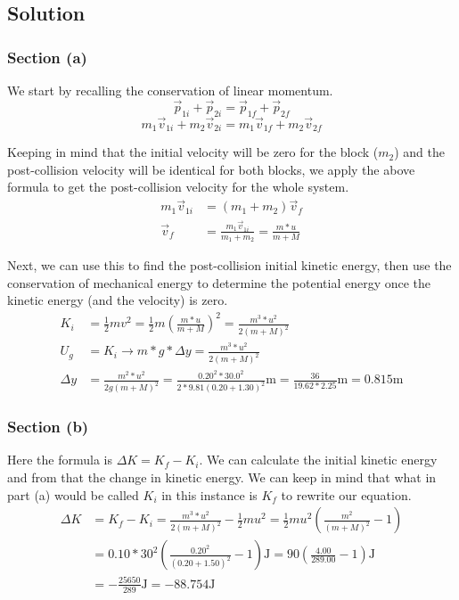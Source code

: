 \documentclass[12pt]{article}
\begin{document}
\subsection*{Solution}
\subsubsection*{Section (a)}
We start by recalling the conservation of linear momentum.
\[ \vec{p}_{1i} + \vec{p}_{2i} = \vec{p}_{1f} + \vec{p}_{2f} \]
\[ m_1\vec{v}_{1i} + m_2\vec{v}_{2i} = m_1\vec{v}_{1f} + m_2\vec{v}_{2f} \]

Keeping in mind that the initial velocity will be zero for the block ($m_2$) and the post-collision velocity will be identical for both blocks, we apply the above formula to get the post-collision velocity for the whole system.
\begin{align*}
    m_1\vec{v}_{1i} &=  (m_1 + m_2)\vec{v}_{f}\\
    \vec{v}_{f} &=  \frac{m_1\vec{v}_{1i}}{m_1 + m_2} = \frac{m*u}{m+M}
\end{align*}

Next, we can use this to find the post-collision initial kinetic energy, then use the conservation of mechanical energy to determine the potential energy once the kinetic energy (and the velocity) is zero.
\begin{align*}
    K_i &=  \frac{1}{2}mv^2
        =   \frac{1}{2}m\left(\frac{m*u}{m+M}\right)^2
        =   \frac{m^3*u^2}{2(m+M)^2}\\
    U_g &=  K_i\rightarrow
    m*g*\Delta y    =  \frac{m^3*u^2}{2(m+M)^2}\\
    \Delta y    &=  \frac{m^2*u^2}{2g(m+M)^2}
        =   \frac{0.20^2*30.0^2}{2*9.81(0.20+1.30)^2}\unit{\meter}
        =   \frac{36}{19.62*2.25}\unit{\meter}
        =   \boxed{0.815\unit{\meter}}
\end{align*}

\pagebreak
\subsubsection*{Section (b)}
Here the formula is \( \Delta K = K_f - K_i \). We can calculate the initial kinetic energy and from that the change in kinetic energy. We can keep in mind that what in part (a) would be called \(K_i\) in this instance is \(K_f\) to rewrite our equation.
\begin{align*}
    \Delta K    &=  K_f - K_i
        =   \frac{m^3*u^2}{2(m+M)^2} - \frac{1}{2}mu^2
        =   \frac{1}{2}mu^2\left(\frac{m^2}{(m+M)^2} - 1\right)\\
        &=  0.10*30^2\left(\frac{0.20^2}{(0.20+1.50)^2} - 1\right) \unit{\joule}
        =   90\left(\frac{4.00}{289.00} - 1\right) \unit{\joule}\\
        &=  \boxed{-\frac{25650}{289} \unit{\joule} = -88.754 \unit{\joule}}
\end{align*}
\end{document}
